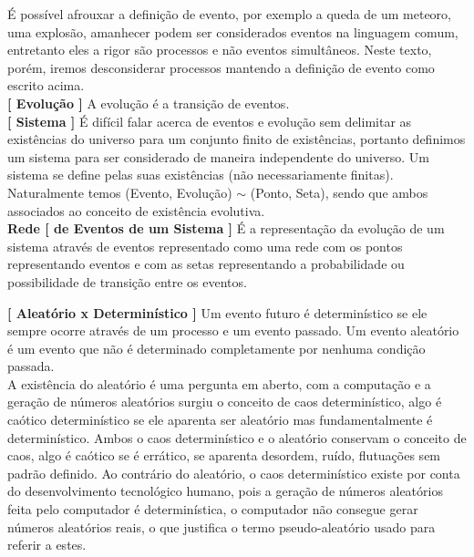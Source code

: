 \documentclass[10pt,a4paper]{report}
\begin{document}
É possível afrouxar a definição de evento, por exemplo a queda de um meteoro, uma explosão, amanhecer podem ser considerados eventos na linguagem comum, entretanto eles a rigor são processos e não eventos simultâneos. Neste texto, porém, iremos desconsiderar processos mantendo a definição de evento como escrito acima.\\

\textbf{[ Evolução ]} A evolução é a transição de eventos. \\

\textbf{[ Sistema ]} É difícil falar acerca de eventos e evolução sem delimitar as existências do universo para um conjunto finito de existências, portanto definimos um sistema para ser considerado de maneira independente do universo. Um sistema se define pelas suas existências (não necessariamente finitas).\\

Naturalmente temos (Evento, Evolução) $\sim$ (Ponto, Seta), sendo que ambos associados ao conceito de existência evolutiva.\\

\textbf{Rede [ de Eventos de um Sistema ]} É a representação da evolução de um sistema através de eventos representado como uma rede com os pontos representando eventos e com as setas representando a probabilidade ou possibilidade de transição entre os eventos.

\hspace{\baselineskip}

\textbf{[ Aleatório x Determinístico ]} Um evento futuro é determinístico se ele sempre ocorre através de um processo e um evento passado. Um evento aleatório é um evento que não é determinado completamente por nenhuma condição passada.\\

A existência do aleatório é uma pergunta em aberto, com a computação e a geração de números aleatórios surgiu o conceito de caos determinístico, algo é caótico determinístico se ele aparenta ser aleatório mas fundamentalmente é determinístico. Ambos o caos determinístico e o aleatório conservam o conceito de caos, algo é caótico se é errático, se aparenta desordem, ruído, flutuações sem padrão definido. Ao contrário do aleatório, o caos determinístico existe por conta do desenvolvimento tecnológico humano, pois a geração de números aleatórios feita pelo computador é determinística, o computador não consegue gerar números aleatórios reais, o que justifica o termo pseudo-aleatório usado para referir a estes.
\end{document}
